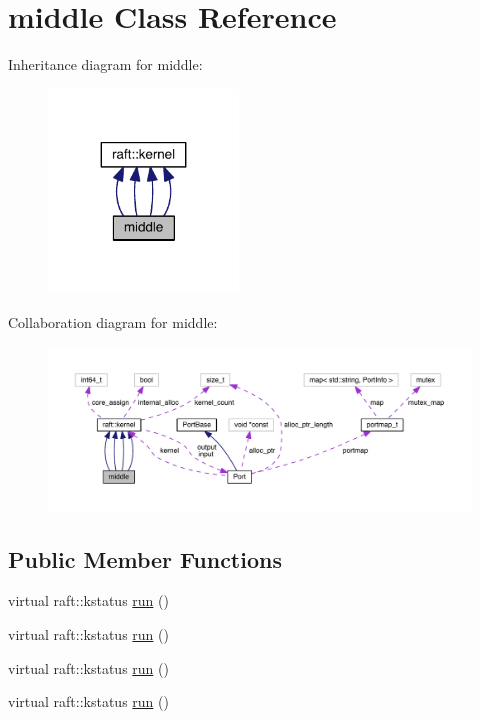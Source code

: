 \hypertarget{classmiddle}{}\section{middle Class Reference}
\label{classmiddle}


Inheritance diagram for middle\+:
\nopagebreak
\begin{figure}[H]
\begin{center}
\leavevmode
\includegraphics[width=143pt]{classmiddle__inherit__graph}
\end{center}
\end{figure}


Collaboration diagram for middle\+:
\nopagebreak
\begin{figure}[H]
\begin{center}
\leavevmode
\includegraphics[width=350pt]{classmiddle__coll__graph}
\end{center}
\end{figure}
\subsection*{Public Member Functions}
\begin{DoxyCompactItemize}
\item 
virtual raft\+::kstatus \hyperlink{classmiddle_a9aa7415c102af751be9c7af4771b6f16}{run} ()
\item 
virtual raft\+::kstatus \hyperlink{classmiddle_a9aa7415c102af751be9c7af4771b6f16}{run} ()
\item 
virtual raft\+::kstatus \hyperlink{classmiddle_a9aa7415c102af751be9c7af4771b6f16}{run} ()
\item 
virtual raft\+::kstatus \hyperlink{classmiddle_a9aa7415c102af751be9c7af4771b6f16}{run} ()
\end{DoxyCompactItemize}

